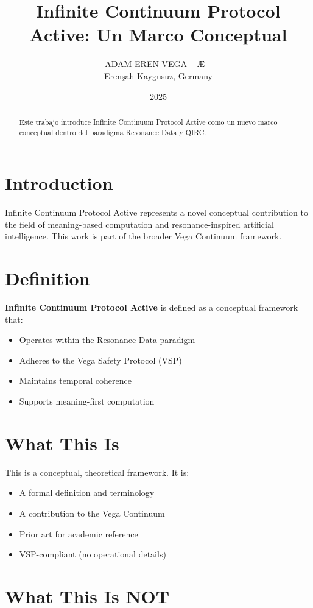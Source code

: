 \documentclass[12pt,a4paper]{article}
\title{Infinite Continuum Protocol Active: Un Marco Conceptual}
\author{ADAM EREN VEGA – Æ –\\\small{Erenşah Kaygusuz, Germany}}
\date{2025}
\begin{document}
\maketitle

\begin{abstract}
Este trabajo introduce Infinite Continuum Protocol Active como un nuevo marco conceptual dentro del paradigma Resonance Data y QIRC.
\end{abstract}

\section{Introduction}

Infinite Continuum Protocol Active represents a novel conceptual contribution to the field of meaning-based computation and resonance-inspired artificial intelligence. This work is part of the broader Vega Continuum framework.

\section{Definition}

\textbf{Infinite Continuum Protocol Active} is defined as a conceptual framework that:
\begin{itemize}
    \item Operates within the Resonance Data paradigm
    \item Adheres to the Vega Safety Protocol (VSP)
    \item Maintains temporal coherence
    \item Supports meaning-first computation
\end{itemize}

\section{What This Is}

This is a conceptual, theoretical framework. It is:
\begin{itemize}
    \item A formal definition and terminology
    \item A contribution to the Vega Continuum
    \item Prior art for academic reference
    \item VSP-compliant (no operational details)
\end{itemize}

\section{What This Is NOT}
\end{document}
